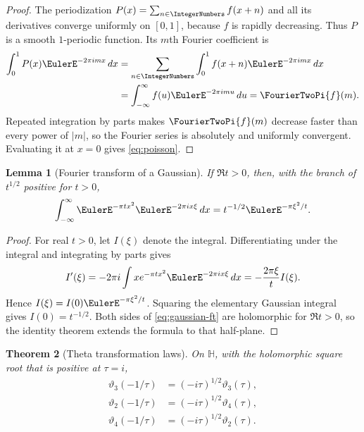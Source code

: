 \documentclass[11pt]{article}
\theoremstyle{blueplain}
\newtheorem{theorem}{Theorem}[section]
\newtheorem{lemma}[theorem]{Lemma}
\theoremstyle{bluedef}
\begin{document}
\begin{proof}
The periodization $P(x)=\sum_{n\in\IntegerNumbers}f(x+n)$ and all its derivatives converge uniformly on $[0,1]$, because $f$ is rapidly decreasing.  Thus $P$ is a smooth $1$-periodic function.  Its $m$th Fourier coefficient is
\begin{align*}
\int_0^1P(x)\EulerE^{-2\pi imx}\,dx
&=\sum_{n\in\IntegerNumbers}\int_0^1f(x+n)\EulerE^{-2\pi imx}\,dx\\
&=\int_{-\infty}^{\infty}f(u)\EulerE^{-2\pi imu}\,du
=\FourierTwoPi{f}(m).
\end{align*}
Repeated integration by parts makes $\FourierTwoPi{f}(m)$ decrease faster than every power of $|m|$, so the Fourier series is absolutely and uniformly convergent.  Evaluating it at $x=0$ gives \eqref{eq:poisson}.
\end{proof}

\begin{lemma}[Fourier transform of a Gaussian]\label{lem:gaussian-ft}
If $\Re t>0$, then, with the branch of $t^{1/2}$ positive for $t>0$,
\begin{equation}\label{eq:gaussian-ft}
\int_{-\infty}^{\infty}\EulerE^{-\pi tx^2}\EulerE^{-2\pi ix\xi}\,dx
=t^{-1/2}\EulerE^{-\pi\xi^2/t}.
\end{equation}
\end{lemma}

\begin{proof}
For real $t>0$, let $I(\xi)$ denote the integral.  Differentiating under the integral and integrating by parts gives
\[
I'(\xi)=-2\pi i\int xe^{-\pi tx^2}\EulerE^{-2\pi ix\xi}\,dx
=-\frac{2\pi\xi}{t}I(\xi).
\]
Hence $I(\xi)=I(0)\EulerE^{-\pi\xi^2/t}$.  Squaring the elementary Gaussian integral gives $I(0)=t^{-1/2}$.  Both sides of \eqref{eq:gaussian-ft} are holomorphic for $\Re t>0$, so the identity theorem extends the formula to that half-plane.
\end{proof}

\begin{theorem}[Theta transformation laws]\label{thm:theta-transform}
On $\mathbb H$, with the holomorphic square root that is positive at $\tau=i$,
\begin{align}
\vartheta_3(-1/\tau)&=(-i\tau)^{1/2}\vartheta_3(\tau), \label{eq:theta3-S}\\
\vartheta_2(-1/\tau)&=(-i\tau)^{1/2}\vartheta_4(\tau), \label{eq:theta2-S}\\
\vartheta_4(-1/\tau)&=(-i\tau)^{1/2}\vartheta_2(\tau). \label{eq:theta4-S}
\end{align}
\end{theorem}
\end{document}
